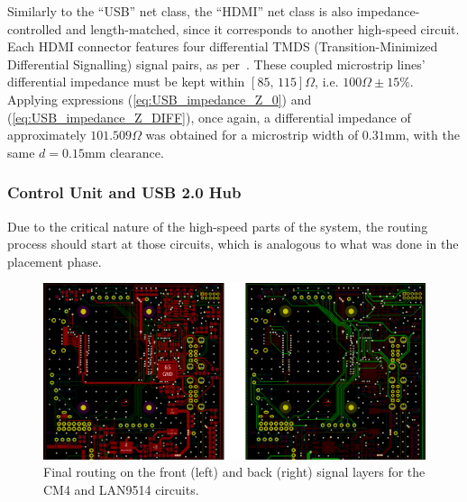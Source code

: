 Similarly to the ``USB'' net class, the ``HDMI'' net class is also impedance-controlled and length-matched, since it corresponds to another high-speed circuit. Each HDMI connector features four differential TMDS (Transition-Minimized Differential Signalling) signal pairs, as per~\cite{HDMI_Routing}. These coupled microstrip lines' differential impedance must be kept within $[85,\, 115]\Omega$, i.e. $100\Omega \pm 15\%$. Applying expressions (\ref{eq:USB_impedance_Z_0}) and (\ref{eq:USB_impedance_Z_DIFF}), once again, a differential impedance of approximately $101.509 \Omega$ was obtained for a microstrip width of $0.31$mm, with the same $d=0.15$mm clearance.


\subsubsection{Control Unit and USB 2.0 Hub}\label{sec:521_CM4_USB}


Due to the critical nature of the high-speed parts of the system, the routing process should start at those circuits, which is analogous to what was done in the placement phase.

\begin{figure}[h]
	\centering
	\includegraphics[width=1.0\textwidth]{Chapters/Figures/chapter5/routing_CM4_LAN9514_FCu_BCu.png}
	\caption{Final routing on the front (left) and back (right) signal layers for the CM4 and LAN9514 circuits.}
	\label{fig:routing_CM4_LAN9514_FCu_BCu}
\end{figure}


